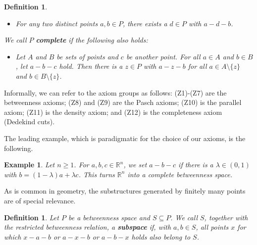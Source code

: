 \documentclass[11pt,a4paper]{article}
\newcommand{\betw}[3]{#1 - #2 - #3}
\newtheorem{definition}[theorem]{Definition}
\newtheorem{example}[theorem]{Example}
\begin{document}
\begin{definition}
\begin{itemize}
    \item[(Z11)] For any two distinct points $a, b \in P$, there exists a $d \in P$ with $\betw{a}{d}{b}$.
\end{itemize}
We call $P$ \textbf{complete} if the following also holds:
\begin{itemize}
    \item[(Z12)] Let $A$ and $B$ be sets of points and $c$ be another point. For all $a \in A$ and $b \in B$, let $\betw{a}{b}{c}$ hold. Then there is a $z \in P$ with $\betw{a}{z}{b}$ for all $a \in A \setminus \{z\}$ and $b \in B \setminus \{z\}$.
\end{itemize}
\end{definition}

Informally, we can refer to the axiom groups as follows: (Z1)-(Z7) are the betweenness axioms; (Z8) and (Z9) are the Pasch axioms; (Z10) is the parallel axiom; (Z11) is the density axiom; and (Z12) is the completeness axiom (Dedekind cuts).

The leading example, which is paradigmatic for the choice of our axioms, is the following.

\begin{example} \label{ex:R_n_betweenness}
Let $n \ge 1$. For $a, b, c \in \mathbb{R}^n$, we set $\betw{a}{b}{c}$ if there is a $\lambda \in (0, 1)$ with $b = (1 - \lambda)a + \lambda c$. This turns $\mathbb{R}^n$ into a complete betweenness space.
\end{example}

As is common in geometry, the substructures generated by finitely many points are of special relevance.

\begin{definition} \label{def:subspace}
Let $P$ be a betweenness space and $S \subseteq P$. We call $S$, together with the restricted betweenness relation, a \textbf{subspace} if, with $a, b \in S$, all points $x$ for which $\betw{x}{a}{b}$ or $\betw{a}{x}{b}$ or $\betw{a}{b}{x}$ holds also belong to $S$.
\end{definition}
\end{document}
